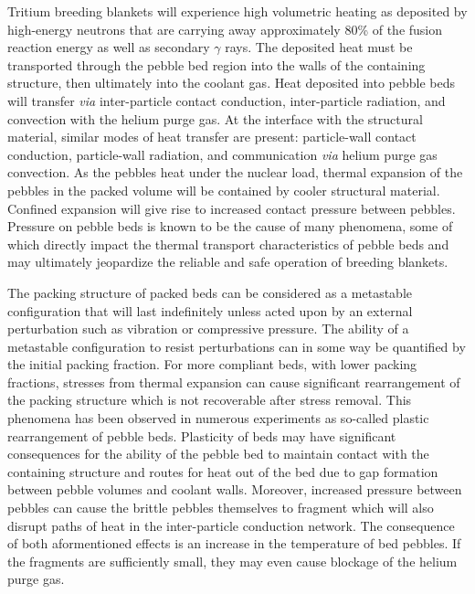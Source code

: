 
Tritium breeding blankets will experience high volumetric heating as deposited by high-energy neutrons that are carrying away approximately 80\% of the fusion reaction energy as well as secondary $\gamma$ rays. The deposited heat must be transported through the pebble bed region into the walls of the containing structure, then ultimately into the coolant gas. Heat deposited into pebble beds will transfer \textit{via} inter-particle contact conduction, inter-particle radiation, and convection with the helium purge gas. At the interface with the structural material, similar modes of heat transfer are present: particle-wall contact conduction, particle-wall radiation, and communication \textit{via} helium purge gas convection. As the pebbles heat under the nuclear load, thermal expansion of the pebbles in the packed volume will be contained by cooler structural material. Confined expansion will give rise to increased contact pressure between pebbles. Pressure on pebble beds is known to be the cause of many phenomena, some of which directly impact the thermal transport characteristics of pebble beds and may ultimately jeopardize the reliable and safe operation of breeding blankets. 

The packing structure of packed beds can be considered as a metastable configuration that will last indefinitely unless acted upon by an external perturbation such as vibration or compressive pressure.\cite{Jaeger1996} The ability of a metastable configuration to resist perturbations can in some way be quantified by the initial packing fraction. For more compliant beds, with lower packing fractions, stresses from thermal expansion can cause significant rearrangement of the packing structure which is not recoverable after stress removal. This phenomena has been observed in numerous experiments as so-called plastic rearrangement of pebble beds.\cite{Reimann:2002kl,Reimann:2000tw,Zhang2015} Plasticity of beds may have significant consequences for the ability of the pebble bed to maintain contact with the containing structure and routes for heat out of the bed due to gap formation between pebble volumes and coolant walls. Moreover, increased pressure between pebbles can cause the brittle pebbles themselves to fragment which will also disrupt paths of heat in the inter-particle conduction network. The consequence of both aformentioned effects is an increase in the temperature of bed pebbles. If the fragments are sufficiently small, they may even cause blockage of the helium purge gas. 

